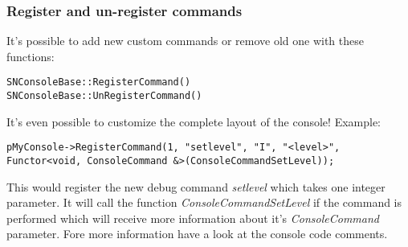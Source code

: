 \subsubsection{Register and un-register commands}
It's possible to add new custom commands or remove old one with these functions:

\begin{lstlisting}[caption=Register and un-register commands]
SNConsoleBase::RegisterCommand()
SNConsoleBase::UnRegisterCommand()
\end{lstlisting}

It's even possible to customize the complete layout of the console! Example:

\begin{lstlisting}[caption=Register command]
pMyConsole->RegisterCommand(1, "setlevel", "I", "<level>", Functor<void, ConsoleCommand &>(ConsoleCommandSetLevel));
\end{lstlisting}

This would register the new debug command \emph{setlevel} which takes one integer parameter. It will call the function \emph{ConsoleCommandSetLevel} if the command is performed which will receive more information about it's \emph{ConsoleCommand} parameter. Fore more information have a look at the console code comments.
